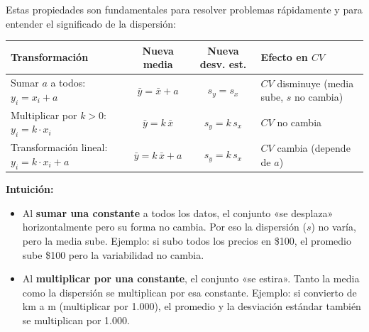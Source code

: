 \documentclass[11pt, letterpaper]{article}
\begin{document}
\begin{tcolorbox}[importantbox, title={¿Qué le pasa a $\bar{x}$ y a $s$ cuando transformamos los datos?}]
Estas propiedades son fundamentales para resolver problemas rápidamente y para entender el significado de la dispersión:

\medskip
\begin{center}
\renewcommand{\arraystretch}{1.6}
\begin{tabular}{p{4.2cm} c c p{3.4cm}}
\toprule
\textbf{Transformación} & \textbf{Nueva media} & \textbf{Nueva desv. est.} & \textbf{Efecto en $CV$}\\
\midrule
Sumar $a$ a todos: \newline $y_i = x_i + a$ &
$\bar{y} = \bar{x} + a$ &
$s_y = s_x$ &
$CV$ disminuye (media sube, $s$ no cambia)\\
Multiplicar por $k>0$: \newline $y_i = k \cdot x_i$ &
$\bar{y} = k\,\bar{x}$ &
$s_y = k\,s_x$ &
$CV$ no cambia\\
Transformación lineal: \newline $y_i = k \cdot x_i + a$ &
$\bar{y} = k\,\bar{x}+a$ &
$s_y = k\,s_x$ &
$CV$ cambia (depende de $a$)\\
\bottomrule
\end{tabular}
\end{center}

\medskip
\textbf{Intuición:}
\begin{itemize}
  \item Al \textbf{sumar una constante} a todos los datos, el conjunto «se desplaza» horizontalmente pero su forma no cambia. Por eso la dispersión ($s$) no varía, pero la media sube. Ejemplo: si subo todos los precios en \$100, el promedio sube \$100 pero la variabilidad no cambia.
  \item Al \textbf{multiplicar por una constante}, el conjunto «se estira». Tanto la media como la dispersión se multiplican por esa constante. Ejemplo: si convierto de km a m (multiplicar por 1.000), el promedio y la desviación estándar también se multiplican por 1.000.
\end{itemize}
\end{tcolorbox}
\end{document}

